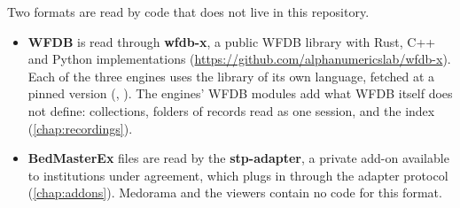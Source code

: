 Two formats are read by code that does not live in this repository.
\begin{itemize}
\item \textbf{WFDB} is read through \textbf{wfdb-x}, a public WFDB library with Rust, C++ and
  Python implementations (\url{https://github.com/alphanumericslab/wfdb-x}). Each of the three
  engines uses the library of its own language, fetched at a pinned version (,
  ). The engines' WFDB modules add what WFDB itself
  does not define: collections, folders of records read as one session, and the index
  (\cref{chap:recordings}).
\item \textbf{BedMasterEx } files are read by the \textbf{stp-adapter}, a private
  add-on available to institutions under agreement, which plugs in through the adapter protocol
  (\cref{chap:addons}). Medorama and the viewers contain no code for this format.
\end{itemize}
